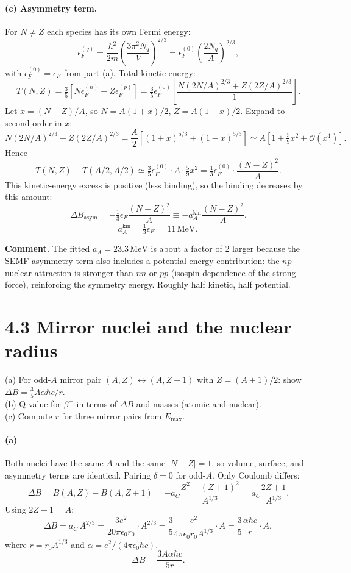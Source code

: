 \documentclass[11pt]{article}
\newcommand{\Q}[1]{\begin{question}#1\end{question}}
\newcommand{\MeV}{\,\mathrm{MeV}}
\begin{document}
\paragraph{(c) Asymmetry term.} For $N\ne Z$ each species has its own Fermi energy:
\[
\epsilon_F^{(q)}=\frac{\hbar^{2}}{2 m}\!\left(\frac{3\pi^{2}N_q}{V}\right)^{2/3}=\epsilon_F^{(0)}\!\left(\frac{2 N_q}{A}\right)^{2/3},
\]
with $\epsilon_F^{(0)}=\epsilon_F$ from part (a). Total kinetic energy:
\[
T(N,Z)=\tfrac{3}{5}\!\left[N\epsilon_F^{(n)}+Z\epsilon_F^{(p)}\right]
=\tfrac{3}{5}\epsilon_F^{(0)}\!\left[\frac{N(2N/A)^{2/3}+Z(2Z/A)^{2/3}}{1}\right].
\]
Let $x=(N-Z)/A$, so $N=A(1+x)/2$, $Z=A(1-x)/2$. Expand to second order in $x$:
\[
N(2N/A)^{2/3}+Z(2Z/A)^{2/3}=\frac{A}{2}\!\left[(1+x)^{5/3}+(1-x)^{5/3}\right]\simeq A\!\left[1+\tfrac{5}{9}x^{2}+\mathcal{O}(x^{4})\right].
\]
Hence
\[
T(N,Z)-T(A/2,A/2)\simeq\tfrac{3}{5}\epsilon_F^{(0)}\cdot A\cdot\tfrac{5}{9}x^{2}=\tfrac{1}{3}\epsilon_F^{(0)}\cdot\frac{(N-Z)^{2}}{A}.
\]
This kinetic-energy excess is positive (less binding), so the binding decreases by this amount:
\[
\Delta B_\mathrm{asym}=-\tfrac{1}{3}\epsilon_F\frac{(N-Z)^{2}}{A}\equiv -a_A^\mathrm{kin}\frac{(N-Z)^{2}}{A}.
\]
\[
a_A^\mathrm{kin}=\tfrac{1}{3}\epsilon_F=\boxed{\,11\MeV.\,}
\]

\textbf{Comment.} The fitted $a_A=23.3\MeV$ is about a factor of 2 larger because the SEMF asymmetry term also includes a potential-energy contribution: the $np$ nuclear attraction is stronger than $nn$ or $pp$ (isospin-dependence of the strong force), reinforcing the symmetry energy. Roughly half kinetic, half potential.

\section*{4.3 \quad Mirror nuclei and the nuclear radius}

\Q{(a) For odd-$A$ mirror pair $(A,Z)\leftrightarrow(A,Z+1)$ with $Z=(A\pm 1)/2$: show $\Delta B=\tfrac{3}{5}A\alpha\hbar c/r$.\\
(b) Q-value for $\beta^+$ in terms of $\Delta B$ and masses (atomic and nuclear).\\
(c) Compute $r$ for three mirror pairs from $E_\mathrm{max}$.}

\paragraph{(a)} Both nuclei have the same $A$ and the same $|N-Z|=1$, so volume, surface, and asymmetry terms are identical. Pairing $\delta=0$ for odd-$A$. Only Coulomb differs:
\[
\Delta B = B(A,Z)-B(A,Z+1)=-a_C\frac{Z^{2}-(Z+1)^{2}}{A^{1/3}}=a_C\frac{2Z+1}{A^{1/3}}.
\]
Using $2Z+1=A$:
\[
\Delta B = a_C\,A^{2/3} = \frac{3 e^{2}}{20\pi\epsilon_{0}r_0}\cdot A^{2/3}=\frac{3}{5}\frac{e^{2}}{4\pi\epsilon_{0}r_0 A^{1/3}}\cdot A=\frac{3}{5}\frac{\alpha\hbar c}{r}\cdot A,
\]
where $r=r_0 A^{1/3}$ and $\alpha=e^{2}/(4\pi\epsilon_{0}\hbar c)$.
\[
\boxed{\;\Delta B=\frac{3 A\alpha\hbar c}{5 r}.\;}
\]
\end{document}
